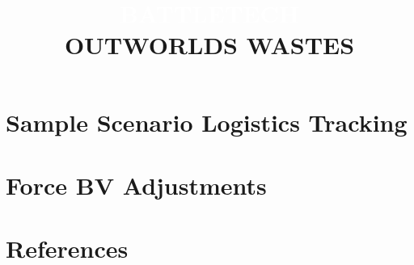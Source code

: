 \documentclass{article}
\begin{document}
\newpage

\section{Sample Scenario Logistics Tracking}



\newpage

\section{Force BV Adjustments}
\label{sec:force_bv_adjustments}



\newpage

\section{References}
\label{sec:references}



\newpage


\clearpage

\setlength{\headsep}{25pt}

\title{
  \selectfont
  \vspace{6px}
  \fontsize{50}{60}\selectfont\textcolor{white}{\MakeUppercase{B}}\fontsize{45}{55}\selectfont\textcolor{white}{\MakeUppercase{attle}}\fontsize{50}{60}\selectfont\textcolor{white}{\MakeUppercase{T}}\fontsize{45}{55}\selectfont\textcolor{white}{\MakeUppercase{ech}}\\
  \fontsize{35}{42}\selectfont\MakeUppercase{Outworlds Wastes}
}
\end{document}
